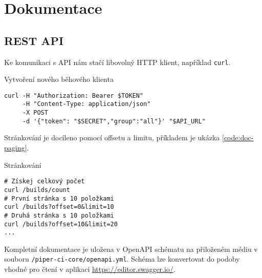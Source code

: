 \chapter{Dokumentace}

\section{REST API}

Ke komunikaci s API nám stačí libovolný HTTP klient, například \verb|curl|.

\begin{listing}[ht]
\caption{Vytvoření nového běhového klienta}
\begin{verbatim}
curl -H "Authorization: Bearer $TOKEN" 
     -H "Content-Type: application/json" 
     -X POST
     -d '{"token": "$SECRET","group":"all"}' "$API_URL"
\end{verbatim}
\end{listing}

Stránkování je docíleno pomocí offsetu a limitu, příkladem je ukázka \ref{code:doc-paging}.

\begin{listing}[ht]
\caption{\label{code:doc-paging}Stránkování}
\begin{verbatim}
# Získej celkový počet
curl /builds/count
# První stránka s 10 položkami
curl /builds?offset=0&limit=10
# Druhá stránka s 10 položkami
curl /builds?offset=10&limit=20
...
\end{verbatim}
\end{listing}

Kompletní dokumentace je uložena v OpenAPI schématu na přiloženém médiu v souboru \verb|/piper-ci-core/openapi.yml|.
Schéma lze konvertovat do podoby vhodné pro čtení v aplikaci \url{https://editor.swagger.io/}.

